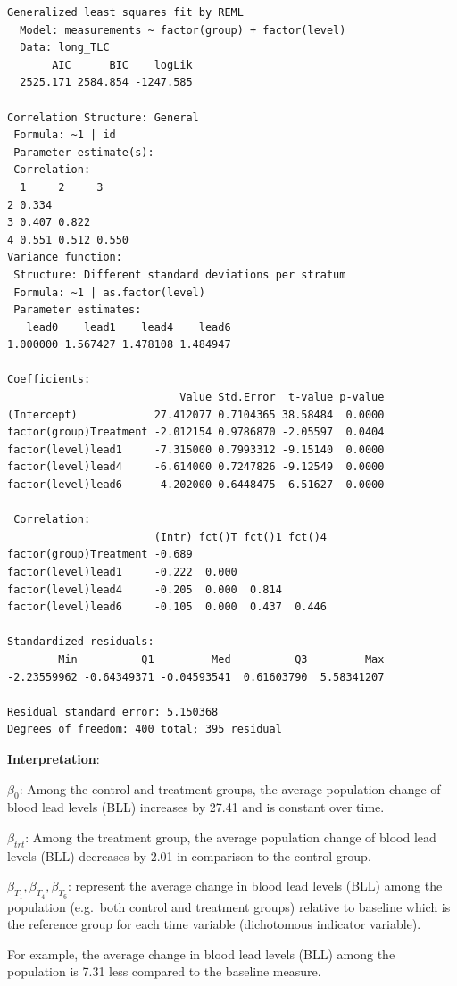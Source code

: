 \documentclass[
  letterpaper,
  DIV=11,
  numbers=noendperiod]{scrreprt}
\begin{document}
\begin{verbatim}
Generalized least squares fit by REML
  Model: measurements ~ factor(group) + factor(level) 
  Data: long_TLC 
       AIC      BIC    logLik
  2525.171 2584.854 -1247.585

Correlation Structure: General
 Formula: ~1 | id 
 Parameter estimate(s):
 Correlation: 
  1     2     3    
2 0.334            
3 0.407 0.822      
4 0.551 0.512 0.550
Variance function:
 Structure: Different standard deviations per stratum
 Formula: ~1 | as.factor(level) 
 Parameter estimates:
   lead0    lead1    lead4    lead6 
1.000000 1.567427 1.478108 1.484947 

Coefficients:
                           Value Std.Error  t-value p-value
(Intercept)            27.412077 0.7104365 38.58484  0.0000
factor(group)Treatment -2.012154 0.9786870 -2.05597  0.0404
factor(level)lead1     -7.315000 0.7993312 -9.15140  0.0000
factor(level)lead4     -6.614000 0.7247826 -9.12549  0.0000
factor(level)lead6     -4.202000 0.6448475 -6.51627  0.0000

 Correlation: 
                       (Intr) fct()T fct()1 fct()4
factor(group)Treatment -0.689                     
factor(level)lead1     -0.222  0.000              
factor(level)lead4     -0.205  0.000  0.814       
factor(level)lead6     -0.105  0.000  0.437  0.446

Standardized residuals:
        Min          Q1         Med          Q3         Max 
-2.23559962 -0.64349371 -0.04593541  0.61603790  5.58341207 

Residual standard error: 5.150368 
Degrees of freedom: 400 total; 395 residual
\end{verbatim}

\textbf{Interpretation}:

\(\beta_{0}\): Among the control and treatment groups, the average
population change of blood lead levels (BLL) increases by 27.41 and is
constant over time.

\(\beta_{trt}\): Among the treatment group, the average population
change of blood lead levels (BLL) decreases by 2.01 in comparison to the
control group.

\(\beta_{T_1}, \beta_{T_4}, \beta_{T_6}\): represent the average change
in blood lead levels (BLL) among the population (e.g.~both control and
treatment groups) relative to baseline which is the reference group for
each time variable (dichotomous indicator variable).

For example, the average change in blood lead levels (BLL) among the
population is 7.31 less compared to the baseline measure.
\end{document}
